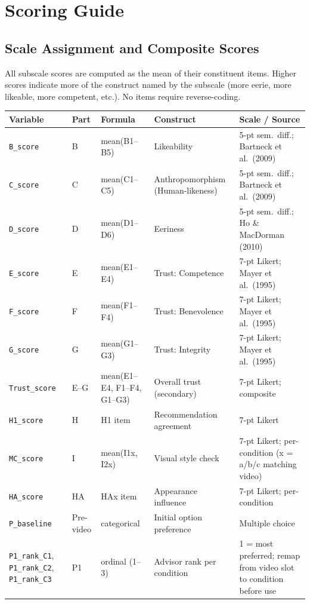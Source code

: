 \documentclass[11pt, a4paper]{article}
\begin{document}
\newpage
\section{Scoring Guide}
\label{sec:scoring}

\subsection{Scale Assignment and Composite Scores}
\label{sec:scoring_scales}

All subscale scores are computed as the mean of their constituent items. Higher scores indicate more of the construct named by the subscale (more eerie, more likeable, more competent, etc.). No items require reverse-coding.

\begin{longtable}{@{}p{2.8cm}p{0.7cm}p{3.6cm}p{3.6cm}p{3.0cm}@{}}
\toprule
\textbf{Variable} & \textbf{Part} & \textbf{Formula} & \textbf{Construct} & \textbf{Scale / Source} \\
\midrule
\endhead
\texttt{B\_score} & B & mean(B1--B5) & Likeability & 5-pt sem.\ diff.; Bartneck et al.\ (2009) \\[4pt]
\texttt{C\_score} & C & mean(C1--C5) & Anthropomorphism (Human-likeness) & 5-pt sem.\ diff.; Bartneck et al.\ (2009) \\[4pt]
\texttt{D\_score} & D & mean(D1--D6) & Eeriness & 5-pt sem.\ diff.; Ho \& MacDorman (2010) \\[4pt]
\texttt{E\_score} & E & mean(E1--E4) & Trust: Competence & 7-pt Likert; Mayer et al.\ (1995) \\[4pt]
\texttt{F\_score} & F & mean(F1--F4) & Trust: Benevolence & 7-pt Likert; Mayer et al.\ (1995) \\[4pt]
\texttt{G\_score} & G & mean(G1--G3) & Trust: Integrity & 7-pt Likert; Mayer et al.\ (1995) \\[4pt]
\texttt{Trust\_score} & E--G & mean(E1--E4, F1--F4, G1--G3) & Overall trust (secondary) & 7-pt Likert; composite \\[4pt]
\texttt{H1\_score} & H & H1 item & Recommendation agreement & 7-pt Likert \\[4pt]
\texttt{MC\_score} & I & mean(I1x, I2x) & Visual style check & 7-pt Likert; per-condition (x = a/b/c matching video) \\[4pt]
\texttt{HA\_score} & HA & HAx item & Appearance influence & 7-pt Likert; per-condition \\[4pt]
\texttt{P\_baseline} & Pre-video & categorical & Initial option preference & Multiple choice \\[4pt]
\texttt{P1\_rank\_C1}, \texttt{P1\_rank\_C2}, \texttt{P1\_rank\_C3} & P1 & ordinal (1--3) & Advisor rank per condition & 1 = most preferred; remap from video slot to condition before use \\
\bottomrule
\end{longtable}
\end{document}
